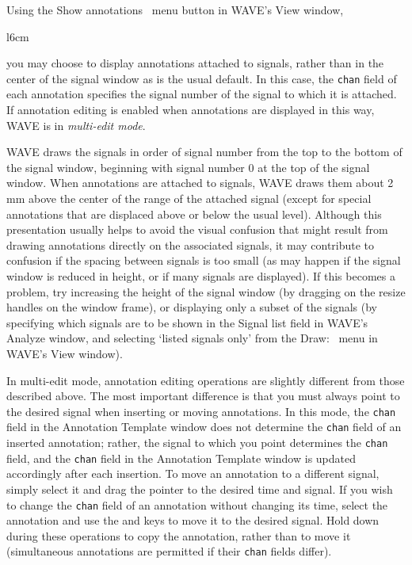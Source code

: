 \documentclass[twoside]{book}
\newcommand{\keycap}[1]{\cornersize{.5}\Ovalbox{\small\sf #1}}
\newcommand{\amenubutton}[1]{{\sf #1}~\keycap{\ensuremath{\nabla}}}
\newcommand{\WAVE}{{\sf WAVE}\xspace}
\begin{document}
Using the \amenubutton{Show annotations} menu button
in \WAVE{}'s {\sf View} window,
\begin{wrapfigure}[6]{l}{6cm}
\mbox{}
\end{wrapfigure}
you may choose to display annotations attached to signals, rather than
in the center of the signal window as is the usual default.  In this case, the
{\tt chan} field of each annotation specifies the signal number of the signal
to which it is attached.  If annotation editing is enabled when annotations
are displayed in this way, \WAVE{} is in \emph{multi-edit mode}.

\WAVE{} draws the signals in order of signal number from the top to
the bottom of the signal window, beginning with signal number 0 at the
top of the signal window.  When annotations are attached to signals,
\WAVE{} draws them about 2 mm above the center of the range of the
attached signal (except for special annotations that are displaced
above or below the usual level).  Although this presentation usually
helps to avoid the visual confusion that might result from drawing
annotations directly on the associated signals, it may contribute to
confusion if the spacing between signals is too small (as may happen
if the signal window is reduced in height, or if many signals are
displayed).  If this becomes a problem, try increasing the height of
the signal window (by dragging on the resize handles on the window
frame), or displaying only a subset of the signals (by specifying
which signals are to be shown in the {\sf Signal list} field in \WAVE{}'s
{\sf Analyze} window, and selecting `{\sf listed signals only}' from the
\amenubutton{Draw:} menu in WAVE's {\sf View} window).

In multi-edit mode, annotation editing operations are slightly
different from those described above.  The most important difference
is that you must always point to the desired signal when inserting or
moving annotations.  In this mode, the {\tt chan} field in the {\sf Annotation
Template} window does not determine the {\tt chan} field of an inserted
annotation; rather, the signal to which you point determines the
{\tt chan} field, and the {\tt chan} field in the {\sf Annotation Template}
window is updated accordingly after each insertion.  To move an annotation to
a different signal, simply select it and drag the pointer to the
desired time and signal.  If you wish to change the {\tt chan} field of an
annotation without changing its time, select the annotation and use
the \keycap{$\uparrow$} and \keycap{$\downarrow$} keys to move it to the
desired signal.  Hold down \keycap{Ctrl} during these operations to copy the
annotation, rather than to move it (simultaneous annotations are
permitted if their {\tt chan} fields differ).
\end{document}
